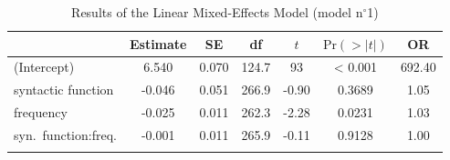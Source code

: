 \begin{table}
\begin{tabularx}{\textwidth}{Q S[table-format=-1.3] S[table-format=1.3] S[table-format=3.1] S[table-format=-1.2] S[table-format=<1.4] S[table-format=3.2] }
  \lsptoprule
 & {Estimate} & {SE} & {df} & {$t$} & {$\text{Pr}(>|t|)$} & {OR} \\ 
  \midrule
(Intercept) & 6.540 & 0.070 & 124.7 & 93 & < 0.001 & 692.40 \\ 
  syntactic function & -0.046 & 0.051 & 266.9 & -0.90 & 0.3689 & 1.05 \\ 
  frequency & -0.025 & 0.011 & 262.3 & -2.28 & 0.0231 & 1.03 \\ 
  syn.\ function:freq. & -0.001 & 0.011 & 265.9 & -0.11 & 0.9128 & 1.00 \\ 
   \lspbottomrule
\end{tabularx}
\caption{Results of the Linear Mixed-Effects Model (model n$^{\circ}$1)}
\label{tab:exp09-m1}
\end{table}
